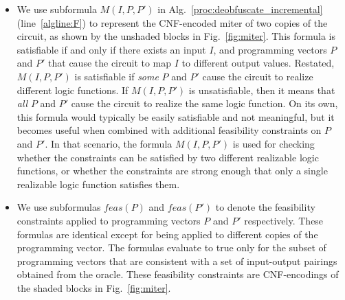 \documentclass[proposal]{umassthesis}  %
\begin{document}
\begin{itemize}
\item We use subformula $M(I,P,P')$ in Alg.~\ref{proc:deobfuscate_incremental} (line~\ref{algline:F}) to represent the CNF-encoded miter of two copies of the circuit, as shown by the unshaded blocks in Fig.~\ref{fig:miter}. {This formula is satisfiable if and only if there exists an input $I$, and programming vectors $P$ and $P'$ that cause the circuit to map $I$ to different output values. Restated, $M(I,P,P')$ is satisfiable if {\itshape some} $P$ and $P'$ cause the circuit to realize different logic functions. If $M(I,P,P')$ is unsatisfiable, then it means that {\itshape all} $P$ and $P'$ cause the circuit to realize the same logic function. On its own, this formula would typically be easily satisfiable and not meaningful, but it becomes useful when combined with additional feasibility constraints on $P$ and $P'$. In that scenario, the formula $M(I,P,P')$ is used for checking whether the constraints can be satisfied by two different realizable logic functions, or whether the constraints are strong enough that only a single realizable logic function satisfies them. 
 }


\item {We use subformulas $feas(P)$ and $feas(P')$ to denote the feasibility constraints applied to programming vectors $P$ and $P'$ respectively. These formulas are identical except for being applied to different copies of the programming vector. The formulas evaluate to true only for the subset of programming vectors that are consistent with a set of input-output pairings obtained from the oracle. These feasibility constraints are CNF-encodings of the shaded blocks in Fig.~\ref{fig:miter}}. 


\end{itemize}
\end{document}

